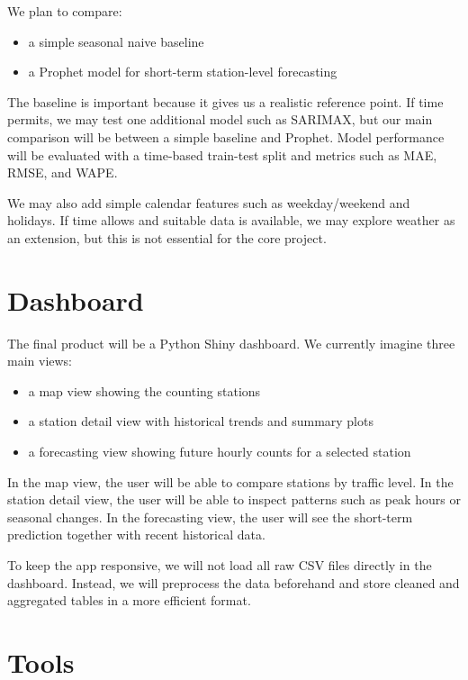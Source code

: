 \documentclass[11pt]{article}
\begin{document}
We plan to compare:

\begin{itemize}
    \item a simple seasonal naive baseline
    \item a Prophet model for short-term station-level forecasting
\end{itemize}

The baseline is important because it gives us a realistic reference point. If time permits, we may test one additional model such as SARIMAX, but our main comparison will be between a simple baseline and Prophet. Model performance will be evaluated with a time-based train-test split and metrics such as MAE, RMSE, and WAPE.

We may also add simple calendar features such as weekday/weekend and holidays. If time allows and suitable data is available, we may explore weather as an extension, but this is not essential for the core project.

\section{Dashboard}

The final product will be a Python Shiny dashboard. We currently imagine three main views:

\begin{itemize}
    \item a map view showing the counting stations
    \item a station detail view with historical trends and summary plots
    \item a forecasting view showing future hourly counts for a selected station
\end{itemize}

In the map view, the user will be able to compare stations by traffic level. In the station detail view, the user will be able to inspect patterns such as peak hours or seasonal changes. In the forecasting view, the user will see the short-term prediction together with recent historical data.

To keep the app responsive, we will not load all raw CSV files directly in the dashboard. Instead, we will preprocess the data beforehand and store cleaned and aggregated tables in a more efficient format.

\section{Tools}
\end{document}
